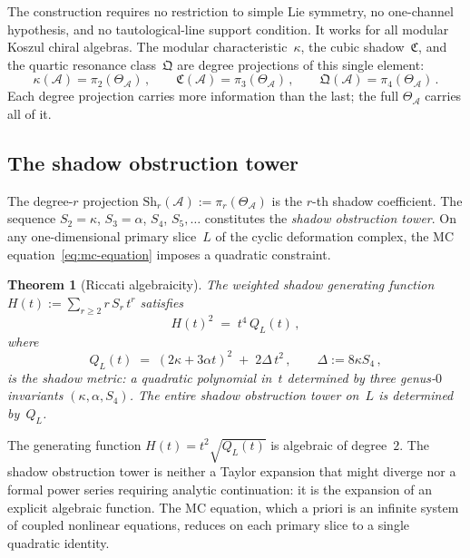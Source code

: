\documentclass[11pt,reqno]{amsart}
\newtheorem{theorem}{Theorem}[section]
\theoremstyle{definition}
\theoremstyle{remark}
\providecommand{\cA}{\mathcal{A}}
\numberwithin{equation}{section}
\begin{document}
The construction requires no restriction to simple Lie
symmetry, no one-channel hypothesis, and no tautological-line
support condition. It works for all modular Koszul chiral
algebras. The modular characteristic~$\kappa$, the cubic
shadow~$\mathfrak{C}$, and the quartic resonance
class~$\mathfrak{Q}$ are degree projections of this single
element:
\begin{equation}\label{eq:shadow-projections}
\kappa(\cA) = \pi_2(\Theta_\cA)\,,
\qquad
\mathfrak{C}(\cA) = \pi_3(\Theta_\cA)\,,
\qquad
\mathfrak{Q}(\cA) = \pi_4(\Theta_\cA)\,.
\end{equation}
Each degree projection carries more information than the
last; the full $\Theta_\cA$ carries all of it.

\subsection{The shadow obstruction tower}
\label{ssec:shadow-tower}

The degree-$r$ projection
$\mathrm{Sh}_r(\cA) := \pi_r(\Theta_\cA)$ is the $r$-th
shadow coefficient. The sequence $S_2 = \kappa$,
$S_3 = \alpha$, $S_4$, $S_5, \ldots$ constitutes the
\emph{shadow obstruction tower}. On any one-dimensional
primary slice~$L$ of the cyclic deformation complex, the
MC equation~\eqref{eq:mc-equation} imposes a quadratic
constraint.

\begin{theorem}[Riccati algebraicity]
\label{thm:riccati}
The weighted shadow generating function
$H(t) := \sum_{r \ge 2} r\,S_r\,t^r$
satisfies
\begin{equation}\label{eq:algebraic-relation}
H(t)^2 \;=\; t^4\,Q_L(t)\,,
\end{equation}
where
\begin{equation}\label{eq:shadow-metric}
Q_L(t)
\;=\;
(2\kappa + 3\alpha t)^2
\;+\;
2\Delta\,t^2\,,
\qquad
\Delta := 8\kappa S_4\,,
\end{equation}
is the \emph{shadow metric}: a quadratic polynomial in~$t$
determined by three genus-$0$ invariants
$(\kappa, \alpha, S_4)$.
The entire shadow obstruction tower on~$L$ is determined
by~$Q_L$.
\end{theorem}

The generating function $H(t) = t^2\sqrt{Q_L(t)}$ is
algebraic of degree~$2$. The shadow obstruction tower
is neither a Taylor expansion that might diverge nor a
formal power series requiring analytic continuation: it is
the expansion of an explicit algebraic function. The
MC equation, which a priori is an infinite system of coupled
nonlinear equations, reduces on each primary slice to a
single quadratic identity.
\end{document}
